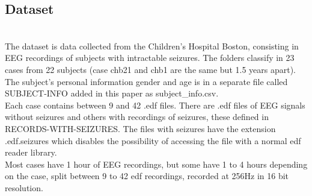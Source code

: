 ﻿\documentclass[10pt,a4paper,twocolumn,twoside]{article}
\begin{document}
\subsection{Dataset}
\leavevmode\\
The dataset\cite{goldberger2000physiobank} is data collected from the Children’s Hospital Boston, consisting in EEG recordings of subjects with intractable seizures. The folders classify in 23 cases from 22 subjects (case chb21 and chb1 are the same but 1.5 years apart). The subject’s personal information gender and age is in a separate file called SUBJECT-INFO added in this paper as subject\_info.csv.
\\
Each case contains between 9 and 42 .edf files. There are .edf files of EEG signals without seizures and others with recordings of seizures, these defined in RECORDS-WITH-SEIZURES. The files with seizures have the extension .edf.seizures which disables the possibility of accessing the file with a normal edf reader library.
\\
Most cases have 1 hour of EEG recordings, but some have 1 to 4 hours depending on the case, split between 9 to 42 edf recordings, recorded at 256Hz in 16 bit resolution.
\\


\end{document}
